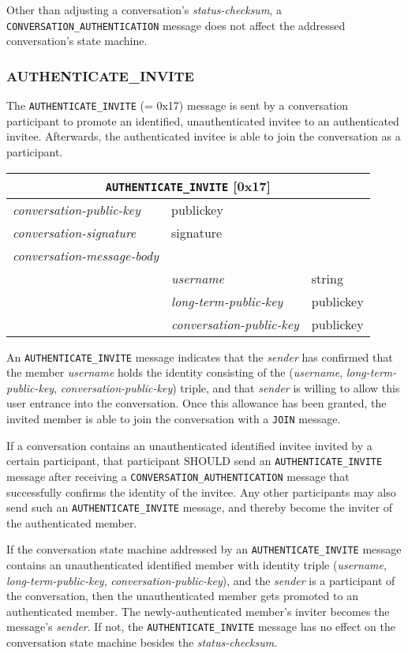 \documentclass{article}
\def\npmessage#1{\texttt{#1}}
\def\field#1{\textit{#1}}
\def\smfield#1{\textsl{#1}}
\def\type#1{\textsf{#1}}
\newenvironment{conversationmessage}[2]{
\newcommand{\messagefield}[2]{
& \field{##1} & \type{##2} \\
\hline
}
\hspace{2em minus 2em}\begin{tabular}{|l|l|l|}
\hline
\multicolumn{3}{|c|}{\npmessage{#1} [#2]} \\
\hline
\hline
\field{conversation-public-key} & \multicolumn{2}{l|}{\type{publickey}} \\
\hline
\field{conversation-signature} & \multicolumn{2}{l|}{\type{signature}} \\
\hline
\field{conversation-message-body} & \multicolumn{2}{l|}{} \\
\hline
}{
\end{tabular}
}
\begin{document}
Other than adjusting a conversation's \smfield{status-checksum}, a \npmessage{CONVERSATION\_AUTHENTICATION} message does not affect the addressed conversation's state machine.


\subsubsection{AUTHENTICATE\_INVITE}
\label{sec:messages/authenticate-invite}

The \npmessage{AUTHENTICATE\_INVITE} (= 0x17) message is sent by a conversation participant to promote an identified, unauthenticated invitee to an authenticated invitee.
Afterwards, the authenticated invitee is able to join the conversation as a participant.

\begin{conversationmessage}{AUTHENTICATE\_INVITE}{0x17}
\messagefield{username}{string}
\messagefield{long-term-public-key}{publickey}
\messagefield{conversation-public-key}{publickey}
\end{conversationmessage}

An \npmessage{AUTHENTICATE\_INVITE} message indicates that the \field{sender} has confirmed that the member \field{username} holds the identity consisting of the (\field{username}, \field{long-term-public-key}, \field{conversation-public-key}) triple, and that \field{sender} is willing to allow this user entrance into the conversation.
Once this allowance has been granted, the invited member is able to join the conversation with a \npmessage{JOIN} message.

If a conversation contains an unauthenticated identified invitee invited by a certain participant, that participant SHOULD send an \npmessage{AUTHENTICATE\_INVITE} message after receiving a \npmessage{CONVERSATION\_AUTHENTICATION} message that successfully confirms the identity of the invitee.
Any other participants may also send such an \npmessage{AUTHENTICATE\_INVITE} message, and thereby become the inviter of the authenticated member.

If the conversation state machine addressed by an \npmessage{AUTHENTICATE\_INVITE} message contains an unauthenticated identified member with identity triple (\field{username}, \field{long-term-public-key}, \field{conversation-public-key}), and the \field{sender} is a participant of the conversation, then the unauthenticated member gets promoted to an authenticated member.
The newly-authenticated member's inviter becomes the message's \field{sender}.
If not, the \npmessage{AUTHENTICATE\_INVITE} message has no effect on the conversation state machine besides the \smfield{status-checksum}.
\end{document}
